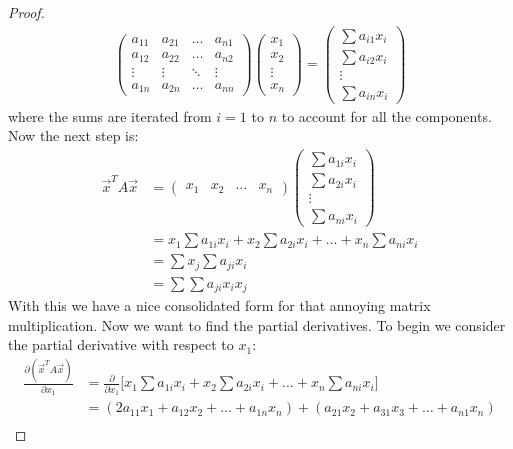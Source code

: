 \documentclass[12pt, letterpaper, onecolumn, conference, final]{IEEEtran}
\theoremstyle{definition}
\theoremstyle{plain}
\begin{document}
\begin{proof}
\begin{equation*}
\begin{split}
\begin{pmatrix}
a_{11} & a_{21} & \dots & a_{n1} \\
a_{12} & a_{22} & \dots & a_{n2} \\
\vdots & \vdots & \ddots & \vdots \\
a_{1n} & a_{2n} & \dots & a_{nn}
\end{pmatrix} \begin{pmatrix}
x_1 \\
x_2 \\
\vdots \\
x_n
\end{pmatrix} = \begin{pmatrix}
\sum a_{i1}x_i \\
\sum a_{i2}x_i \\
\vdots \\
\sum a_{in}x_i
\end{pmatrix}
\end{split}
\end{equation*}
where the sums are iterated from $i = 1$ to $n$ to account for all the components. Now the next step is:
\renewcommand*{\arraystretch}{1.2}
\begin{equation*}
\begin{split}
\overrightarrow{x}^TA\overrightarrow{x} &= \begin{pmatrix}
x_1 & x_2 & \dots & x_n
\end{pmatrix} \begin{pmatrix}
\sum a_{1i}x_i \\
\sum a_{2i}x_i \\
\vdots \\
\sum a_{ni}x_i
\end{pmatrix} \\
&= x_1\sum a_{1i}x_i + x_2\sum a_{2i}x_i + \dots + x_n\sum a_{ni}x_i \\
&= \sum x_j \sum a_{ji}x_i \\
&= \sum\sum a_{ji}x_ix_j
\end{split}
\end{equation*}
With this we have a nice consolidated form for that annoying matrix multiplication. Now we want to find the partial derivatives. To begin we consider the partial derivative with respect to $x_1$:
\begin{equation*}
\begin{split}
\frac{\partial(\overrightarrow{x}^TA\overrightarrow{x})}{\partial x_1} &= \frac{\partial}{\partial x_1} \Big[ x_1\sum a_{1i}x_i + x_2\sum a_{2i}x_i + \dots + x_n\sum a_{ni}x_i \Big] \\
&= (2a_{11}x_1 + a_{12}x_2 + \dots + a_{1n}x_n) + (a_{21}x_2 + a_{31}x_3 + \dots + a_{n1}x_n) \\

\end{split}
\end{equation*}
\end{proof}
\end{document}
